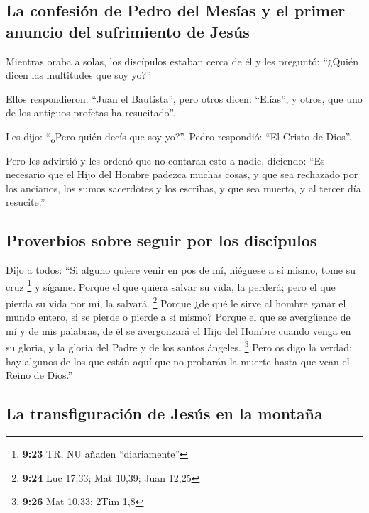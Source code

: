 \hypertarget{la-confesiuxf3n-de-pedro-del-mesuxedas-y-el-primer-anuncio-del-sufrimiento-de-jesuxfas}{%
\subsection{La confesión de Pedro del Mesías y el primer anuncio del
sufrimiento de
Jesús}\label{la-confesiuxf3n-de-pedro-del-mesuxedas-y-el-primer-anuncio-del-sufrimiento-de-jesuxfas}}

 Mientras oraba a solas, los discípulos estaban cerca de
él y les preguntó: ``¿Quién dicen las multitudes que soy yo?''

 Ellos respondieron: ``Juan el Bautista'', pero otros
dicen: ``Elías'', y otros, que uno de los antiguos profetas ha
resucitado''.

 Les dijo: ``¿Pero quién decís que soy yo?''. Pedro
respondió: ``El Cristo de Dios''.

 Pero les advirtió y les ordenó que no contaran esto a
nadie,  diciendo: ``Es necesario que el Hijo del Hombre
padezca muchas cosas, y que sea rechazado por los ancianos, los sumos
sacerdotes y los escribas, y que sea muerto, y al tercer día resucite.''

\hypertarget{proverbios-sobre-seguir-por-los-discuxedpulos}{%
\subsection{Proverbios sobre seguir por los
discípulos}\label{proverbios-sobre-seguir-por-los-discuxedpulos}}

 Dijo a todos: ``Si alguno quiere venir en pos de mí,
niéguese a sí mismo, tome su cruz \footnote{\textbf{9:23} TR, NU añaden
  ``diariamente''} y sígame.  Porque el que quiera salvar
su vida, la perderá; pero el que pierda su vida por mí, la salvará.
\footnote{\textbf{9:24} Luc 17,33; Mat 10,39; Juan 12,25}
 Porque ¿de qué le sirve al hombre ganar el mundo entero,
si se pierde o pierde a sí mismo?  Porque el que se
avergüence de mí y de mis palabras, de él se avergonzará el Hijo del
Hombre cuando venga en su gloria, y la gloria del Padre y de los santos
ángeles. \footnote{\textbf{9:26} Mat 10,33; 2Tim 1,8} 
Pero os digo la verdad: hay algunos de los que están aquí que no
probarán la muerte hasta que vean el Reino de Dios.''

\hypertarget{la-transfiguraciuxf3n-de-jesuxfas-en-la-montauxf1a}{%
\subsection{La transfiguración de Jesús en la
montaña}\label{la-transfiguraciuxf3n-de-jesuxfas-en-la-montauxf1a}}

